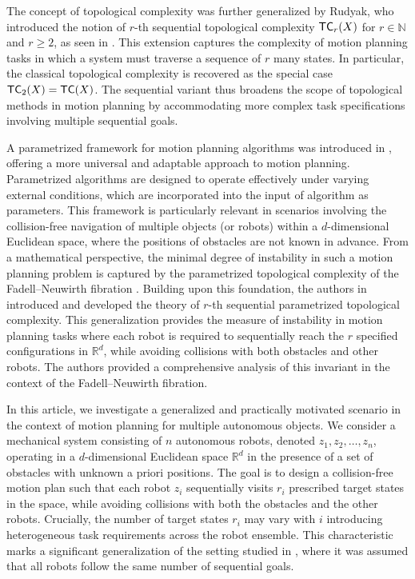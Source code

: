 \documentclass[12pt,oneside,reqno]{amsart}
\theoremstyle{plain}
\theoremstyle{definition}
\theoremstyle{remark}
\newcommand{\TC}{{\sf {TC}}}
\newcommand{\rr}{{\mathbb {R}}}
\begin{document}
The concept of topological complexity was further generalized by Rudyak, who introduced the notion of $r$-th sequential topological complexity $\TC_r(X)$ for $r \in \mathbb{N}$ and $r \geq 2$, as seen in \cite{Rud10}. This extension captures the complexity of motion planning tasks in which a system must traverse a sequence of $r$ many states. In particular, the classical topological complexity is recovered as the special case $\TC_2(X) = \TC(X)$. The sequential variant thus broadens the scope of topological methods in motion planning by accommodating more complex task specifications involving multiple sequential goals.    

A parametrized framework for motion planning algorithms was introduced in \cite{CohFW21}, offering a more universal and adaptable approach to motion planning. Parametrized algorithms are designed to operate effectively under varying external conditions, which are incorporated into the input of algorithm as parameters. This framework is particularly relevant in scenarios involving the collision-free navigation of multiple objects (or robots) within a $d$-dimensional Euclidean space, where the positions of obstacles are not known in advance. From a mathematical perspective, the minimal degree of instability in such a motion planning problem is captured by the parametrized topological complexity of the Fadell–Neuwirth fibration \cite{CohFW21, CohFW22, FarW}.
Building upon this foundation, the authors in \cite{FarP22, FarP23} introduced and developed the theory of $r$-th sequential parametrized topological complexity. This generalization provides the measure of instability in motion planning tasks where each robot is required to sequentially reach the $r$ specified configurations in $\mathbb{R}^d$, while avoiding collisions with both obstacles and other robots. The authors provided a comprehensive analysis of this invariant in the context of the Fadell–Neuwirth fibration. 
  
In this article, we investigate a generalized and practically motivated scenario in the context of motion planning for multiple autonomous objects. We consider a mechanical system consisting of $n$ autonomous robots, denoted  $z_1, z_2, \dots, z_n$, operating in a $d$-dimensional Euclidean space $\rr^d$ in the presence of a set of obstacles with unknown a priori positions. 
The goal is to design a collision-free motion plan such that each robot $z_i$ sequentially visits $r_i$ prescribed target states in the space, while avoiding collisions with both the obstacles and the other robots. Crucially, the number of target states 
$r_i$ may vary with $i$ introducing heterogeneous task requirements across the robot ensemble. This characteristic marks a significant generalization of the setting studied in \cite{FarP22, FarP23}, where it was assumed that all robots follow the same number of sequential goals.
\end{document}
